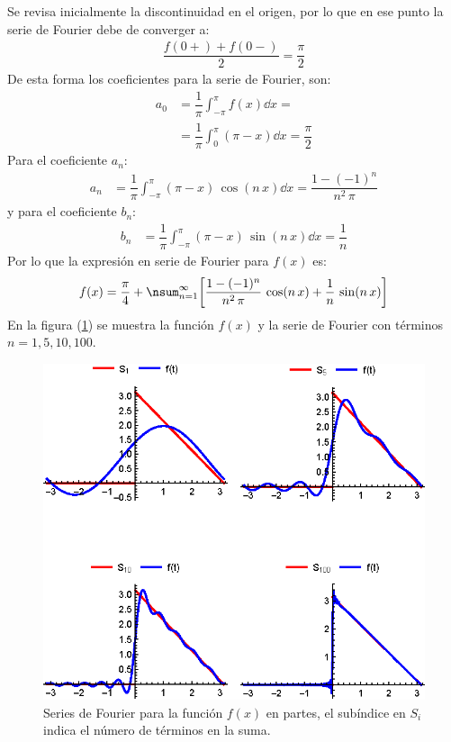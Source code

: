 Se revisa inicialmente la discontinuidad en el origen, por lo que en ese punto la serie de Fourier debe de converger a:
\begin{align*}
\dfrac{f(0+) + f(0-)}{2} = \dfrac{\pi}{2}
\end{align*}
De esta forma los coeficientes para la serie de Fourier, son:
\begin{align*}
a_{0} &= \dfrac{1}{\pi} \int_{-\pi}^{\pi} f(x) \dd{x} = \\[0.5em]
&= \dfrac{1}{\pi} \int_{0}^{\pi} (\pi - x) \dd{x} = \dfrac{\pi}{2}
\end{align*}
Para el coeficiente $a_{n}$:
\begin{align*}
a_{n} &= \dfrac{1}{\pi} \int_{-\pi}^{\pi} (\pi - x) \, \cos (n \, x) \dd{x} = \dfrac{1 - (-1)^{n}}{n^{2} \, \pi}
\end{align*}
y para el coeficiente $b_{n}$:
\begin{align*}
b_{n} &= \dfrac{1}{\pi} \int_{-\pi}^{\pi} (\pi - x) \, \sin (n \, x) \dd{x} = \dfrac{1}{n}
\end{align*}
Por lo que la expresión en serie de Fourier para $f(x)$ es:
\begin{align*}
f(x) = \dfrac{\pi}{4} + \nsum_{n=1}^{\infty} \bigg[ \dfrac{1 - (-1)^{n}}{n^{2} \, \pi} \, \cos (n \, x) + \dfrac{1}{n} \, \sin (n \, x) \bigg]
\end{align*}
En la figura (\ref{fig:06_01_04}) se muestra la función $f(x)$ y la serie de Fourier con términos $n = 1, 5, 10, 100$.
\begin{figure}[H]
    \centering
    \includegraphics[scale=1.5]{Imagenes/Funciones_Ortogonales_04.eps}
    \caption{Series de Fourier para la función $f(x)$ en partes, el subíndice en $S_{i}$ indica el número de términos en la suma.}
    \label{fig:06_01_04}
\end{figure}

